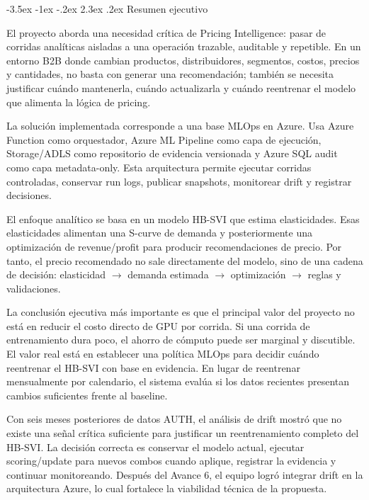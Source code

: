 \documentclass[11pt,letterpaper]{article}
\makeatletter
\renewcommand\section{\@startsection{section}{1}{\z@}
  {-3.5ex \@plus -1ex \@minus -.2ex}
  {2.3ex \@plus .2ex}
  {\Large\bfseries\sffamily\color{azulTec}}}
\makeatother
\begin{document}
\section{Resumen ejecutivo}

El proyecto aborda una necesidad crítica de Pricing Intelligence: pasar de corridas analíticas aisladas a una operación trazable, auditable y repetible. En un entorno B2B donde cambian productos, distribuidores, segmentos, costos, precios y cantidades, no basta con generar una recomendación; también se necesita justificar cuándo mantenerla, cuándo actualizarla y cuándo reentrenar el modelo que alimenta la lógica de pricing.

La solución implementada corresponde a una base MLOps en Azure. Usa Azure Function como orquestador, Azure ML Pipeline como capa de ejecución, Storage/ADLS como repositorio de evidencia versionada y Azure SQL audit como capa metadata-only. Esta arquitectura permite ejecutar corridas controladas, conservar run logs, publicar snapshots, monitorear drift y registrar decisiones.

El enfoque analítico se basa en un modelo HB-SVI que estima elasticidades. Esas elasticidades alimentan una S-curve de demanda y posteriormente una optimización de revenue/profit para producir recomendaciones de precio. Por tanto, el precio recomendado no sale directamente del modelo, sino de una cadena de decisión: elasticidad $\rightarrow$ demanda estimada $\rightarrow$ optimización $\rightarrow$ reglas y validaciones.

La conclusión ejecutiva más importante es que el principal valor del proyecto no está en reducir el costo directo de GPU por corrida. Si una corrida de entrenamiento dura poco, el ahorro de cómputo puede ser marginal y discutible. El valor real está en establecer una política MLOps para decidir cuándo reentrenar el HB-SVI con base en evidencia. En lugar de reentrenar mensualmente por calendario, el sistema evalúa si los datos recientes presentan cambios suficientes frente al baseline.

Con seis meses posteriores de datos AUTH, el análisis de drift mostró que no existe una señal crítica suficiente para justificar un reentrenamiento completo del HB-SVI. La decisión correcta es conservar el modelo actual, ejecutar scoring/update para nuevos combos cuando aplique, registrar la evidencia y continuar monitoreando. Después del Avance 6, el equipo logró integrar drift en la arquitectura Azure, lo cual fortalece la viabilidad técnica de la propuesta.
\end{document}
